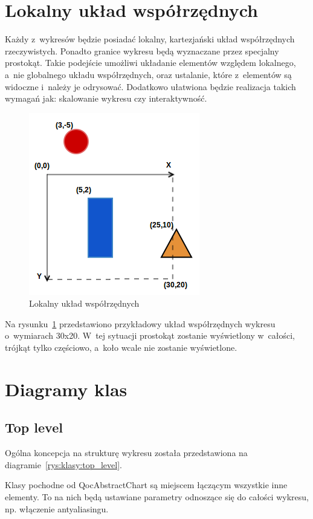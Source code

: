 \section{Lokalny układ współrzędnych}
Każdy z~wykresów będzie posiadać lokalny, kartezjański układ współrzędnych rzeczywistych. Ponadto granice wykresu będą wyznaczane przez specjalny prostokąt. Takie podejście umożliwi układanie elementów względem lokalnego, a~nie globalnego układu współrzędnych, oraz ustalanie, które z~elementów są widoczne i~należy je odrysować. Dodatkowo ułatwiona będzie realizacja takich wymagań jak: skalowanie wykresu czy interaktywność. 

\begin{figure}
\centering
\caption{Lokalny układ współrzędnych}\label{rys:uklad:wspolrzednych}
\includegraphics{img/uklad_wspolrzednych.png}
\end{figure}

Na rysunku~\ref{rys:uklad:wspolrzednych} przedstawiono przykładowy układ współrzędnych wykresu o~wymiarach 30x20. W~tej sytuacji prostokąt zostanie wyświetlony w~całości, trójkąt tylko częściowo, a~koło wcale nie zostanie wyświetlone.

\section{Diagramy klas}

\subsection{Top level}
Ogólna koncepcja na strukturę wykresu została przedstawiona na diagramie~\ref{rys:klasy:top_level}.

Klasy pochodne od QocAbstractChart są miejscem łączącym wszystkie inne elementy. To na nich będą ustawiane parametry odnoszące się do całości wykresu, np. włączenie antyaliasingu.

